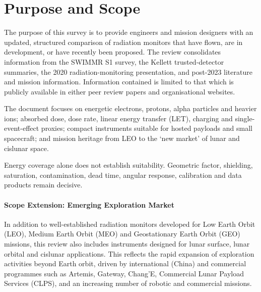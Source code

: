 
\begin{abstract}
This report updates earlier surveys of space-trusted energetic-particle and radiation-monitoring instruments from the SWIMMR Project. It is written as an engineering reference. The review begins with the mature low-Earth-orbit (LEO), medium-Earth-orbit (MEO) and geostationary-orbit (GEO) markets, then considers highly elliptical, interplanetary and emerging cislunar applications. Instruments are compared using factual parameters such as detector technology, particle species, energy coverage, mass, power, volume, field of view, interfaces and flight heritage. Missing values are marked \ND. The final section identifies technology gaps and emerging opportunities. 
\end{abstract}




\section{Purpose and Scope}
The purpose of this survey is to provide engineers and mission designers with an updated, structured comparison of radiation monitors that have flown, are in development, or have recently been proposed. The review consolidates information from the SWIMMR S1 survey, the Kellett trusted-detector summaries, the 2020 radiation-monitoring presentation, and post-2023 literature and mission information. Information contained is limited to that which is publicly available in either peer review papers and organisational websites.

The document focuses on energetic electrons, protons, alpha particles and heavier ions; absorbed dose, dose rate, linear energy transfer (LET), charging and single-event-effect proxies; compact instruments suitable for hosted payloads and small spacecraft; and mission heritage from LEO to the `new market' of lunar and cislunar space.

Energy coverage alone does not establish suitability. Geometric factor, shielding, saturation, contamination, dead time, angular response, calibration and data products remain decisive.

\paragraph{Scope Extension: Emerging Exploration Market}

In addition to well-established radiation monitors developed for Low Earth Orbit (LEO), Medium Earth Orbit (MEO) and Geostationary Earth Orbit (GEO) missions, this review also includes instruments designed for lunar surface, lunar orbital and cislunar applications. This reflects the rapid expansion of exploration activities beyond Earth orbit, driven by international (China) and commercial programmes such as Artemis, Gateway, Chang'E, Commercial Lunar Payload Services (CLPS), and an increasing number of robotic and commercial missions. 

